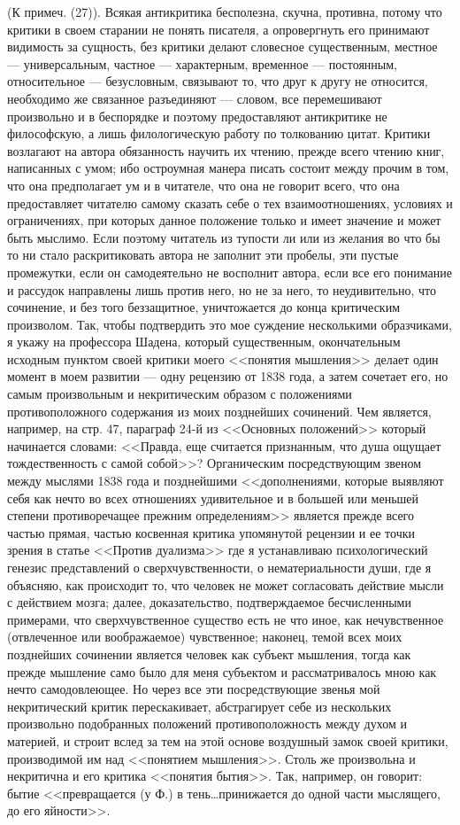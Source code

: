 \documentclass[12pt]{article}
\begin{document}
(К примеч. (27)). Всякая антикритика бесполезна, скучна, противна, потому что критики в своем старании не понять писателя, а опровергнуть его принимают видимость за сущность, без критики делают словесное существенным, местное --- универсальным, частное --- характерным, временное --- постоянным, относительное --- безусловным, связывают то, что друг к другу не относится, необходимо же связанное разъединяют --- словом, все перемешивают произвольно и в беспорядке и поэтому предоставляют антикритике не философскую, а лишь филологическую работу по толкованию цитат. Критики возлагают на автора обязанность научить их чтению, прежде всего чтению книг, написанных с умом; ибо остроумная манера писать состоит между прочим в том, что она предполагает ум и в читателе, что она не говорит всего, что она предоставляет читателю самому сказать себе о тех взаимоотношениях, условиях и ограничениях, при которых данное положение только и имеет значение и может быть мыслимо. Если поэтому читатель из тупости ли или из желания во что бы то ни стало раскритиковать автора не заполнит эти пробелы, эти пустые промежутки, если он самодеятельно не восполнит автора, если все его понимание и рассудок направлены лишь против него, но не за него, то неудивительно, что сочинение, и без того беззащитное, уничтожается до конца критическим произволом. Так, чтобы подтвердить это мое суждение несколькими образчиками, я укажу на профессора Шадена, который существенным, окончательным исходным пунктом своей критики моего <<понятия мышления>> делает один момент в моем развитии --- одну рецензию от 1838 года, а затем сочетает его, но самым произвольным и некритическим образом с положениями противоположного содержания из моих позднейших сочинений. Чем является, например, на стр. 47, параграф 24-й из <<Основных положений>>  который начинается словами: <<Правда, еще считается признанным, что душа ощущает тождественность с самой собой>>? Органическим посредствующим звеном между мыслями 1838 года и позднейшими <<дополнениями, которые выявляют себя как нечто во всех отношениях удивительное и в большей или меньшей степени противоречащее прежним определениям>>  является прежде всего частью прямая, частью косвенная критика упомянутой рецензии и ее точки зрения в статье <<Против дуализма>>  где я устанавливаю психологический генезис представлений о сверхчувственности, о нематериальности души, где я объясняю, как происходит то, что человек не может согласовать действие мысли с действием мозга; далее, доказательство, подтверждаемое бесчисленными примерами, что сверхчувственное существо есть не что иное, как нечувственное (отвлеченное или воображаемое) чувственное; наконец, темой всех моих позднейших сочинении является человек как субъект мышления, тогда как прежде мышление само было для меня субъектом и рассматривалось мною как нечто самодовлеющее. Но через все эти посредствующие звенья мой некритический критик перескакивает, абстрагирует себе из нескольких произвольно подобранных положений противоположность между духом и материей, и строит вслед за тем на этой основе воздушный замок своей критики, производимой им над <<понятием мышления>>. Столь же произвольна и некритична и его критика <<понятия бытия>>. Так, например, он говорит: бытие <<превращается (у Ф.) в тень\dots принижается до одной части мыслящего, до его яйности>>. 
\end{document}

